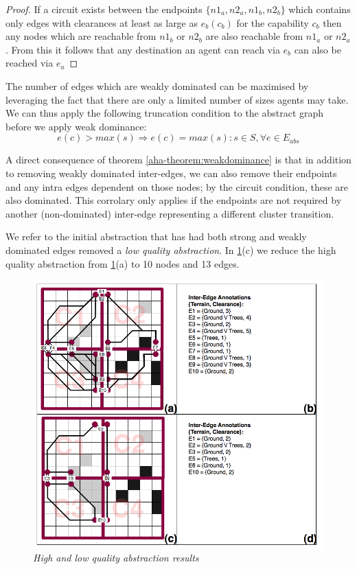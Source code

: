 \begin{proof}
If a circuit exists between the endpoints $\lbrace n1_{a}, n2_{a}, n1_{b}, n2_{b} \rbrace$ which contains only edges with clearances at least as large as $e_{b}(c_{b})$ for the capability $c_{b}$ then any nodes which are reachable from $n1_{b}$ or $n2_{b}$ are also reachable from $n1_{a}$ or $n2_{a}$.
From this it follows that any destination an agent can reach via $e_{b}$ can also be reached via $e_{a}$ 
\end{proof}
The number of edges which are weakly dominated can be maximised by leveraging the fact that there are only a limited number of sizes agents may take. We can thus apply the following truncation condition to the abstract graph before we apply weak dominance:
\begin{equation}
e(c) > max(s) \Rightarrow e(c) = max(s) : s \in S, \forall e \in E_{abs}
\end{equation}
\par \indent
A direct consequence of theorem \ref{aha-theorem:weakdominance} is that in addition to removing weakly dominated inter-edges, we can also remove their endpoints and any intra edges dependent on those nodes; by the circuit condition, these are also dominated. 
This corrolary only applies if the endpoints are not required by another (non-dominated) inter-edge representing a different cluster transition. 
\par \indent
We refer to the initial abstraction that has had both strong and weakly dominated edges removed a \emph{low quality abstraction}.
In \ref{aha-fig:abstractgraph}(c) we reduce the high quality abstraction from \ref{aha-fig:abstractgraph}(a) to 10 nodes and 13 edges.
\begin{figure}[htbp]
        \caption{\emph{High and low quality abstraction results} }
        \begin{center}
                        \includegraphics[scale=0.25]{diagrams/abstraction_result.png}
        \end{center}
        \label{aha-fig:abstractgraph}
\end{figure}
